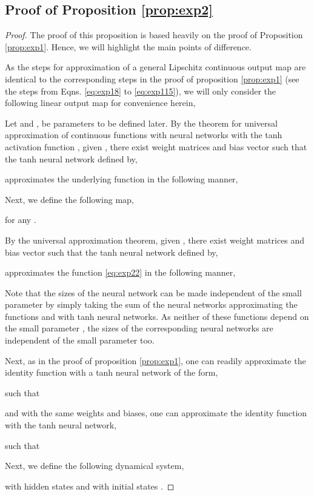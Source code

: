 \documentclass{article} \usepackage{iclr2022_conference,times}
\begin{document}
\subsection{Proof of Proposition \ref{prop:exp2}}
\label{app:exp2pf}
\begin{proof}
The proof of this proposition is based heavily on the proof of Proposition \ref{prop:exp1}. Hence, we will highlight the main points of difference. 

As the steps for approximation of a general Lipschitz continuous output map are identical to the corresponding steps in the proof of proposition \ref{prop:exp1} (see the steps from Eqns. \eqref{eq:exp18} to \eqref{eq:exp115}), we will only consider the following linear output map for convenience herein, 

Let  and , be parameters to be defined later. By the theorem for universal approximation of continuous functions with neural networks with the tanh activation function , given , there exist weight matrices  and bias vector  such that the tanh neural network defined by,

approximates the underlying function  in the following manner, 

Next, we define the following map, 

for any .

By the universal approximation theorem, given 
, there exist weight matrices  and bias vector  such that the tanh neural network defined by,

approximates the function  \eqref{eq:exp22} in the following manner, 

Note that the sizes of the neural network  can be made independent of the small parameter  by simply taking the sum of the neural networks approximating the functions  and  with tanh neural networks. As neither of these functions depend on the small parameter , the sizes of the corresponding neural networks are independent of the small parameter too. 

Next, as in the proof of proposition \ref{prop:exp1}, one can readily approximate the identity function  with a tanh neural network of the form,

 such that

and with the same weights and biases, one can approximate the identity function  with the tanh neural network,

 such that


Next, we define the following dynamical system,

with hidden states  and with initial states .


\end{proof}
\end{document}
